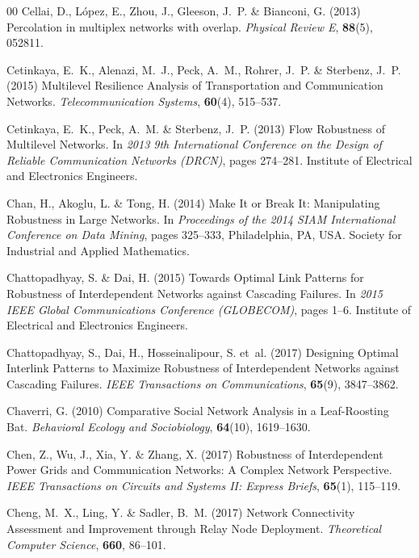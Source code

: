 \documentclass{comnet-mod}
\begin{document}
\begin{thebibliography}{00}
Cellai, D., L{\'o}pez, E., Zhou, J., Gleeson, J.~P. {\&} Bianconi, G. (2013)
  Percolation in multiplex networks with overlap. {\em {Physical Review E}},
  \textbf{88}(5), 052811.

Cetinkaya, E.~K., Alenazi, M.~J., Peck, A.~M., Rohrer, J.~P. {\&} Sterbenz,
  J.~P. (2015)  {Multilevel Resilience Analysis of Transportation and
  Communication Networks}. {\em {Telecommunication Systems}}, \textbf{60}(4),
  515--537.

Cetinkaya, E.~K., Peck, A.~M. {\&} Sterbenz, J.~P. (2013)  {Flow Robustness of
  Multilevel Networks}. In {\em {2013 9th International Conference on the
  Design of Reliable Communication Networks ({{DRCN}})}}, pages 274--281.
  {Institute of Electrical and Electronics Engineers}.

Chan, H., Akoglu, L. {\&} Tong, H. (2014)  {Make It or Break It:
  {{Manipulating}} Robustness in Large Networks}. In {\em {Proceedings of the
  2014 {{SIAM}} International Conference on Data Mining}}, pages 325--333,
  Philadelphia, PA, USA. {Society for Industrial and Applied Mathematics}.

Chattopadhyay, S. {\&} Dai, H. (2015)  {Towards Optimal Link Patterns for
  Robustness of Interdependent Networks against Cascading Failures}. In {\em
  {2015 {{IEEE}} Global Communications Conference ({{GLOBECOM}})}}, pages 1--6.
  {Institute of Electrical and Electronics Engineers}.

Chattopadhyay, S., Dai, H., Hosseinalipour, S.  et~al. (2017)  {Designing
  Optimal Interlink Patterns to Maximize Robustness of Interdependent Networks
  against Cascading Failures}. {\em {IEEE Transactions on Communications}},
  \textbf{65}(9), 3847--3862.

Chaverri, G. (2010)  {Comparative Social Network Analysis in a Leaf-Roosting
  Bat}. {\em {Behavioral Ecology and Sociobiology}}, \textbf{64}(10),
  1619--1630.

Chen, Z., Wu, J., Xia, Y. {\&} Zhang, X. (2017)  {Robustness of Interdependent
  Power Grids and Communication Networks: {{A}} Complex Network Perspective}.
  {\em {IEEE Transactions on Circuits and Systems II: Express Briefs}},
  \textbf{65}(1), 115--119.

Cheng, M.~X., Ling, Y. {\&} Sadler, B.~M. (2017)  {Network Connectivity
  Assessment and Improvement through Relay Node Deployment}. {\em {Theoretical
  Computer Science}}, \textbf{660}, 86--101.


\end{thebibliography}
\end{document}
